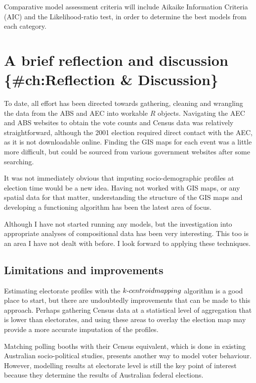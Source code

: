 \documentclass{monashthesis}
\theoremstyle{definition}
\theoremstyle{definition}
\theoremstyle{definition}
\theoremstyle{remark}
\begin{document}
Comparative model assessment criteria will include Aikaike Information
Criteria (AIC) and the Likelihood-ratio test, in order to determine the
best models from each category.

\chapter{A brief reflection and discussion \{\#ch:Reflection \&
Discussion\}}\label{a-brief-reflection-and-discussion-chreflection-discussion}

To date, all effort has been directed towards gathering, cleaning and
wrangling the data from the ABS and AEC into workable \(R\) objects.
Navigating the AEC and ABS websites to obtain the vote counts and Census
data was relatively straightforward, although the 2001 election required
direct contact with the AEC, as it is not downloadable online. Finding
the GIS maps for each event was a little more difficult, but could be
sourced from various government websites after some searching.

It was not immediately obvious that imputing socio-demographic profiles
at election time would be a new idea. Having not worked with GIS maps,
or any spatial data for that matter, understanding the structure of the
GIS maps and developing a functioning algorithm has been the latest area
of focus.

Although I have not started running any models, but the investigation
into appropriate analyses of compositional data has been very
interesting. This too is an area I have not dealt with before. I look
forward to applying these techniques.

\section{Limitations and
improvements}\label{limitations-and-improvements}

Estimating electorate profiles with the
\(k{\text -}centroid \space mapping\) algorithm is a good place to
start, but there are undoubtedly improvements that can be made to this
approach. Perhaps gathering Census data at a statistical level of
aggregation that is lower than electorates, and using these areas to
overlay the election map may provide a more accurate imputation of the
profiles.

Matching polling booths with their Census equivalent, which is done in
existing Australian socio-political studies, presents another way to
model voter behaviour. However, modelling results at electorate level is
still the key point of interest because they determine the results of
Australian federal elections.
\end{document}
